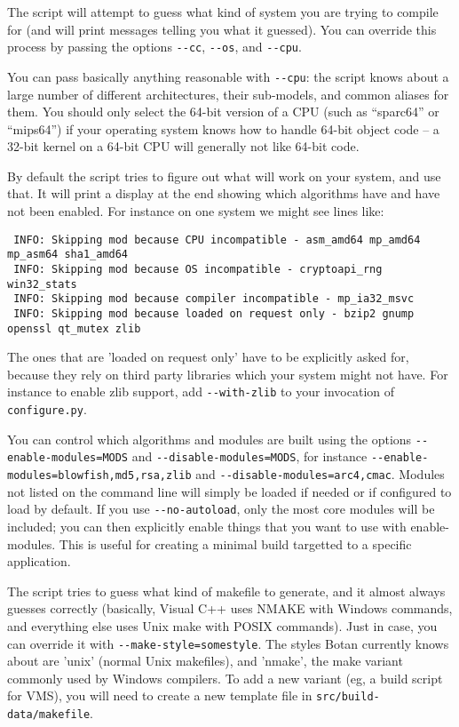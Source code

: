 \documentclass{article}
\newcommand{\filename}[1]{\texttt{#1}}
\begin{document}
The script will attempt to guess what kind of system you are trying
to compile for (and will print messages telling you what it guessed).
You can override this process by passing the options \verb|--cc|,
\verb|--os|, and \verb|--cpu|.

You can pass basically anything reasonable with \verb|--cpu|: the
script knows about a large number of different architectures, their
sub-models, and common aliases for them. You should only select the
64-bit version of a CPU (such as ``sparc64'' or ``mips64'') if your
operating system knows how to handle 64-bit object code -- a 32-bit
kernel on a 64-bit CPU will generally not like 64-bit code.

By default the script tries to figure out what will work on your
system, and use that. It will print a display at the end showing which
algorithms have and have not been enabled. For instance on one system
we might see lines like:

\begin{verbatim}
 INFO: Skipping mod because CPU incompatible - asm_amd64 mp_amd64 mp_asm64 sha1_amd64
 INFO: Skipping mod because OS incompatible - cryptoapi_rng win32_stats
 INFO: Skipping mod because compiler incompatible - mp_ia32_msvc
 INFO: Skipping mod because loaded on request only - bzip2 gnump openssl qt_mutex zlib
\end{verbatim}

The ones that are 'loaded on request only' have to be explicitly asked
for, because they rely on third party libraries which your system
might not have. For instance to enable zlib support, add
\verb|--with-zlib| to your invocation of \verb|configure.py|.

You can control which algorithms and modules are built using the
options \verb|--enable-modules=MODS| and
\verb|--disable-modules=MODS|, for instance
\verb|--enable-modules=blowfish,md5,rsa,zlib| and
\verb|--disable-modules=arc4,cmac|.  Modules not listed on the command
line will simply be loaded if needed or if configured to load by
default. If you use \verb|--no-autoload|, only the most core modules
will be included; you can then explicitly enable things that you want
to use with enable-modules. This is useful for creating a minimal
build targetted to a specific application.

The script tries to guess what kind of makefile to generate, and it
almost always guesses correctly (basically, Visual C++ uses NMAKE with
Windows commands, and everything else uses Unix make with POSIX
commands). Just in case, you can override it with
\verb|--make-style=somestyle|. The styles Botan currently knows about
are 'unix' (normal Unix makefiles), and 'nmake', the make variant
commonly used by Windows compilers. To add a new variant (eg, a build
script for VMS), you will need to create a new template file in
\filename{src/build-data/makefile}.
\end{document}
